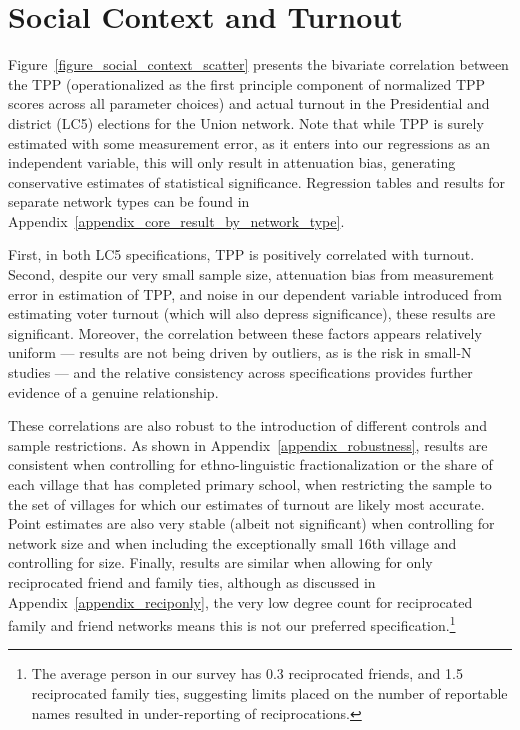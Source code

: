 \documentclass[12pt]{article}
\begin{document}
\section{Social Context and Turnout}\label{section_results}

Figure~\ref{figure_social_context_scatter} presents the bivariate correlation between the TPP (operationalized as the first principle component of normalized TPP scores across all parameter choices) and actual turnout in the Presidential and district (LC5) elections for the Union network. Note that while TPP is surely estimated with some measurement error, as it enters into our regressions as an independent variable, this will only result in attenuation bias, generating conservative estimates of statistical significance. Regression tables and results for separate network types can be found in Appendix~\ref{appendix_core_result_by_network_type}.

First, in both LC5 specifications, TPP is positively correlated with turnout. Second, despite our very small sample size, attenuation bias from measurement error in estimation of TPP, and noise in our dependent variable introduced from estimating voter turnout (which will also depress significance), these results are significant. Moreover, the correlation between these factors appears relatively uniform --- results are not being driven by outliers, as is the risk in small-N studies --- and the relative consistency across specifications provides further evidence of a genuine relationship.

These correlations are also robust to the introduction of different controls and sample restrictions. As shown in Appendix~\ref{appendix_robustness}, results are consistent when controlling for ethno-linguistic fractionalization or the share of each village that has completed primary school, when restricting the sample to the set of villages for which our estimates of turnout are likely most accurate. Point estimates are also very stable (albeit not significant) when controlling for network size and when including the exceptionally small 16th village and controlling for size. Finally, results are similar when allowing for only reciprocated friend and family ties, although as discussed in Appendix~\ref{appendix_reciponly}, the very low degree count for reciprocated family and friend networks means this is not our preferred specification.\footnote{The average person in our survey has 0.3 reciprocated friends, and 1.5 reciprocated family ties, suggesting limits placed on the number of reportable names resulted in under-reporting of reciprocations.}
\end{document}
